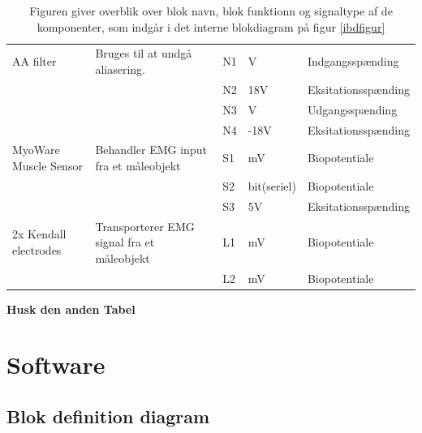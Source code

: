 \begin{table} [H]
  \centering

\begin{tabular}  {|p{3cm}|p{4cm}|p{1cm}|p{1.5cm}|p{3.8cm}| }

\hline

AA filter & Bruges til at undgå aliasering.  &  N1 & V & Indgangsspænding  \\ \cline{3-5}
	 &  & N2 & $  ${18V} & Eksitationsspænding \\ \cline{3-5} 
	 &  & N3 & V & Udgangsspænding \\ \cline{3-5} 
	 &  & N4 & $  ${-18V} & Eksitationsspænding \\ \cline{3-5} 
	 
	 \hline
	 

MyoWare Muscle Sensor & Behandler EMG input fra et måleobjekt 		 &  S1 & mV & Biopotentiale  \\ \cline{3-5}
	 &  & S2 & bit(seriel) & Biopotentiale \\ \cline{3-5} 
	 &  & S3 & 5V & Eksitationsspænding \\ \cline{3-5} \hline
	 
	 
2x Kendall electrodes & Transporterer EMG signal fra et måleobjekt  &  L1 & mV & Biopotentiale  \\ \cline{3-5}
	 &  & L2 & mV & Biopotentiale \\ \cline{3-5} \hline
	 

\end{tabular}
 \caption{Figuren giver overblik over blok navn, blok funktionn og signaltype af de komponenter, som indgår i det interne blokdiagram på figur \ref{ibdfigur}} \label{tab:Sigbeskriv.}
\end{table}

\textbf{Husk den anden Tabel}
\chapter{Software} \label{swafsnit}
\section{Blok definition diagram}

